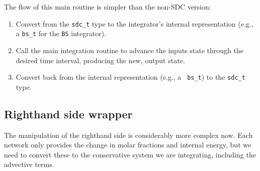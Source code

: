 The flow of this main routine is simpler than the non-SDC version:
\begin{enumerate}
\item Convert from the {\tt sdc\_t} type to the integrator's internal representation
  (e.g., a {\tt bs\_t} for the {\tt BS} integrator).

\item Call the main integration routine to advance the inputs state
  through the desired time interval, producing the new, output state.

\item Convert back from the internal representation (e.g., a {\tt
  bs\_t}) to the {\tt sdc\_t} type.
\end{enumerate}

\subsection{Righthand side wrapper}

The manipulation of the righthand side is considerably more complex
now.  Each network only provides the change in molar
fractions  and internal energy, but
we need to convert these to the conservative system we are
integrating, including the advective terms.


